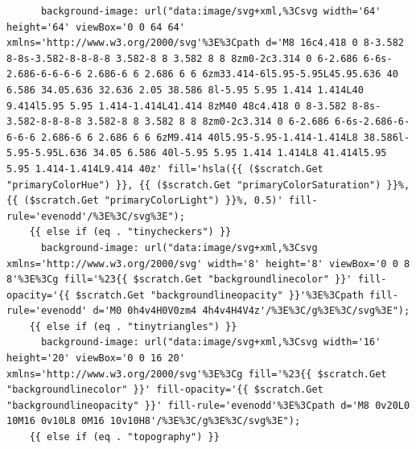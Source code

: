\documentclass[11pt]{article}
\begin{document}
\begin{enumerate}
\begin{verbatim}
      background-image: url("data:image/svg+xml,%3Csvg width='64' height='64' viewBox='0 0 64 64' xmlns='http://www.w3.org/2000/svg'%3E%3Cpath d='M8 16c4.418 0 8-3.582 8-8s-3.582-8-8-8-8 3.582-8 8 3.582 8 8 8zm0-2c3.314 0 6-2.686 6-6s-2.686-6-6-6-6 2.686-6 6 2.686 6 6 6zm33.414-6l5.95-5.95L45.95.636 40 6.586 34.05.636 32.636 2.05 38.586 8l-5.95 5.95 1.414 1.414L40 9.414l5.95 5.95 1.414-1.414L41.414 8zM40 48c4.418 0 8-3.582 8-8s-3.582-8-8-8-8 3.582-8 8 3.582 8 8 8zm0-2c3.314 0 6-2.686 6-6s-2.686-6-6-6-6 2.686-6 6 2.686 6 6 6zM9.414 40l5.95-5.95-1.414-1.414L8 38.586l-5.95-5.95L.636 34.05 6.586 40l-5.95 5.95 1.414 1.414L8 41.414l5.95 5.95 1.414-1.414L9.414 40z' fill='hsla({{ ($scratch.Get "primaryColorHue") }}, {{ ($scratch.Get "primaryColorSaturation") }}%, {{ ($scratch.Get "primaryColorLight") }}%, 0.5)' fill-rule='evenodd'/%3E%3C/svg%3E");
    {{ else if (eq . "tinycheckers") }}
      background-image: url("data:image/svg+xml,%3Csvg xmlns='http://www.w3.org/2000/svg' width='8' height='8' viewBox='0 0 8 8'%3E%3Cg fill='%23{{ $scratch.Get "backgroundlinecolor" }}' fill-opacity='{{ $scratch.Get "backgroundlineopacity" }}'%3E%3Cpath fill-rule='evenodd' d='M0 0h4v4H0V0zm4 4h4v4H4V4z'/%3E%3C/g%3E%3C/svg%3E");
    {{ else if (eq . "tinytriangles") }}
      background-image: url("data:image/svg+xml,%3Csvg width='16' height='20' viewBox='0 0 16 20' xmlns='http://www.w3.org/2000/svg'%3E%3Cg fill='%23{{ $scratch.Get "backgroundlinecolor" }}' fill-opacity='{{ $scratch.Get "backgroundlineopacity" }}' fill-rule='evenodd'%3E%3Cpath d='M8 0v20L0 10M16 0v10L8 0M16 10v10H8'/%3E%3C/g%3E%3C/svg%3E");
    {{ else if (eq . "topography") }}

\end{verbatim}
\end{enumerate}
\end{document}
